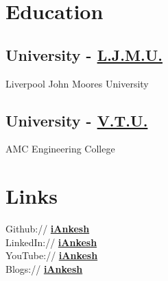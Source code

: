\documentclass[a4paper]{deedy-resume-openfont}
\begin{document}
%
%
\lastupdated

%
%

%
%

\begin{minipage}[t]{0.33\textwidth} 


\section{Education} 

\subsection{University - \href{https://www.ljmu.ac.uk/}{L.J.M.U.}}
Liverpool John Moores University \\
\sectionsep

\subsection{University - \href{https://vtu.ac.in/en/}{V.T.U.}}
AMC Engineering College \\


\section{Links} 
Github:// \href{https://github.com/iankesh}{\bf iAnkesh} \\
LinkedIn://  \href{https://www.linkedin.com/in/iankesh}{\bf iAnkesh} \\
YouTube://  \href{https://www.youtube.com/c/iAnkesh}{\bf iAnkesh} \\
Blogs://  \href{https://iankesh.blogspot.com/2020/08/my-blogs.html}{\bf iAnkesh} \\


\end{minipage}
\end{document}
